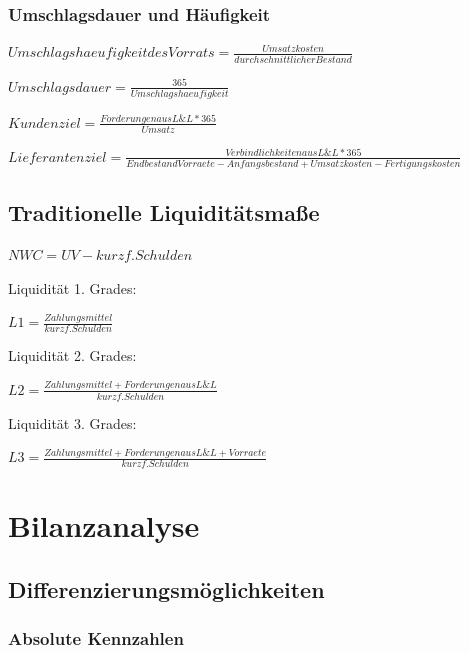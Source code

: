 \documentclass{article}
\begin{document}
\subsubsection{Umschlagsdauer und Häufigkeit}

\begin{center}
$Umschlagshaeufigkeit des Vorrats = \frac{Umsatzkosten}{durchschnittlicher Bestand}$
\end{center}
\begin{center}
$Umschlagsdauer = \frac{365}{Umschlagshaeufigkeit}$
\end{center}
\begin{center}
$Kundenziel = \frac{Forderungen aus L\&L * 365}{Umsatz} $
\end{center}
\begin{center}
$Lieferantenziel = \frac{Verbindlichkeiten aus L\&L * 365}{Endbestand Vorraete - Anfangsbestand + Umsatzkosten - Fertigungskosten}$
\end{center}
\subsection{Traditionelle Liquiditätsmaße}
\begin{center}
$NWC = UV - kurzf. Schulden$
\end{center}
Liquidität 1. Grades: \begin{center}
$ L1 = \frac{Zahlungsmittel}{kurzf. Schulden}$
\end{center}
Liquidität 2. Grades: \begin{center}
$ L2 = \frac{Zahlungsmittel + Forderungen aus L\&L}{kurzf. Schulden}$
\end{center}
Liquidität 3. Grades: \begin{center}
$ L3 = \frac{Zahlungsmittel + Forderungen aus L\&L + Vorraete}{kurzf. Schulden}$
\end{center}
 



\section{Bilanzanalyse}
\subsection{Differenzierungsmöglichkeiten}
\subsubsection{Absolute Kennzahlen}
\end{document}
